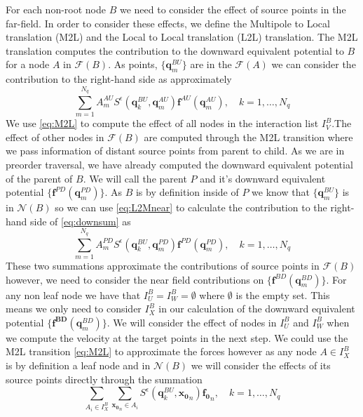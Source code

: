 For each non-root node $B$ we need to consider the effect of source points in the far-field. In order to consider these effects, we define the Multipole to Local translation (M2L) and the Local to Local translation (L2L) translation. The M2L translation computes the contribution to the downward equivalent potential to $B$ for a node $A$ in $\mathcal{F}(B)$. As points, $\{\bm{q}^{BU}_m\}$ are in the $\mathcal{F}(A)$ we can consider the contribution to the right-hand side as approximately
\begin{equation}
\label{eq:M2L}
\sum_{m=1}^{N_{q}} A_{m}^{A U} S^\epsilon\left(\bm{q}_{k}^{B U}, \bm{q}_{m}^{A U}\right) \bm{f}^{A U}\left(\bm{q}_{m}^{A U}\right), \quad k=1,\dots,N_q
\end{equation}
We use \cref{eq:M2L} to compute the effect of all nodes in the interaction list $I_V^B$.The effect of other nodes in $\mathcal{F}(B)$ are computed through the M2L transition where we pass information of distant source points from parent to child. As we are in preorder traversal, we have already computed the downward equivalent potential of the parent of $B$. We will call the parent $P$ and it's downward equivalent potential $\{\bm{f}^{PD}(\bm{q}^{PD}_m)\}$. As $B$ is by definition inside of $P$ we know that $\{\bm{q}^{BU}_m\}$ is in $\mathcal{N}(B)$ so we can use \cref{eq:L2Mnear} to calculate the contribution to the right-hand side of \cref{eq:downsum} as
\begin{equation}
\label{eq:L2L}
\sum_{m=1}^{N_{q}} A_{m}^{P D} S^\epsilon\left(\bm{q}_{k}^{B U}, \bm{q}_{m}^{P D}\right) \bm{f}^{P D}\left(\bm{q}_{m}^{P D}\right), \quad k=1,\dots,N_q
\end{equation}
These two summations approximate the contributions of source points in $\mathcal{F}(B)$ however, we need to consider the near field contributions on $\{\bm{f}^{B D}(\bm{q}^{BD}_m)\}$. For any non leaf node we have that $I_U^B = I_W^B = \emptyset$ where $\emptyset$ is the empty set. This means we only need to consider $I_X^B$ in our calculation of the downward equivalent potential $\{\bm{f^{BD}}(\bm{q}^{BD}_m)\}$. We will consider the effect of nodes in $I_U^B$ and $I_W^B$ when we compute the velocity at the target points in the next step. We could use the M2L transition \cref{eq:M2L} to approximate the forces  however as any node $A \in I_X^B$ is by definition a leaf node and in $\mathcal{N}(B)$ we will consider the effects of its source points directly through the summation
\begin{equation}
\label{eq:X}
    \sum_{A_i \in I_X^B} \sum_{{\bm{x_0}}_n\in A_i} S^\epsilon\left(\bm{q}^{BU}_{k}, {\bm{x_0}}_{n}\right) {\bm{f_0}}_{n}, \quad k=1,\dots,N_q
\end{equation}

